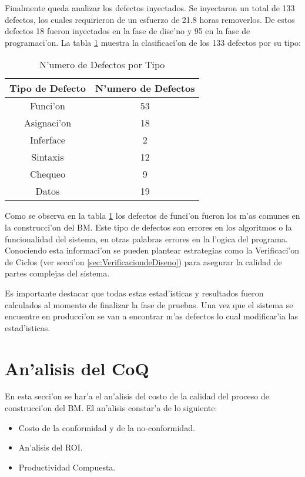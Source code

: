 Finalmente queda analizar los defectos inyectados. Se inyectaron un total de 133 defectos, los cuales requirieron de un esfuerzo de 21.8 horas removerlos. De estos defectos 18 fueron inyectados en la fase de dise'no y 95 en la fase de programaci'on. La tabla \ref{N'umerodeDefectosporTipo} muestra la clasificaci'on de los 133 defectos por su tipo:

\begin{table}[htbp]
	\centering
		\begin{tabular}{| c | c |}
			\hline
			 \textbf{Tipo de Defecto} & \textbf{N'umero de Defectos} \\ \hline
			 Funci'on & 53 \\ \hline
			 Asignaci'on & 18 \\ \hline
			 Inferface & 2 \\ \hline
			 Sintaxis & 12 \\ \hline
			 Chequeo & 9 \\ \hline
			 Datos & 19 \\ \hline
		\end{tabular}
	\caption{N'umero de Defectos por Tipo}
	\label{N'umerodeDefectosporTipo}
\end{table}

Como se observa en la tabla \ref{N'umerodeDefectosporTipo} los defectos de funci'on fueron los m'as comunes en la construcci'on del BM. Este tipo de defectos son errores en los algoritmos o la funcionalidad del sistema, en otras palabras errores en la l'ogica del programa. Conociendo esta informaci'on se pueden plantear estrategias como la Verificaci'on de Ciclos (ver secci'on \ref{sec:VerificaciondeDiseno}) para asegurar la calidad de partes complejas del sistema.

Es importante destacar que todas estas estad'isticas y resultados fueron calculados al momento de finalizar la fase de pruebas. Una vez que el sistema se encuentre en producci'on se van a encontrar m'as defectos lo cual modificar'ia las estad'isticas.

\section{An'alisis del CoQ}
\label{sec:AnalisisdelCoQ}
\noindent
En esta secci'on se har'a el an'alisis del costo de la calidad del proceso de construcci'on del BM. El an'alisis constar'a de lo siguiente:

\begin{itemize}
	\item Costo de la conformidad y de la no-conformidad.
	\item An'alisis del ROI.
	\item Productividad Compuesta.
\end{itemize}

